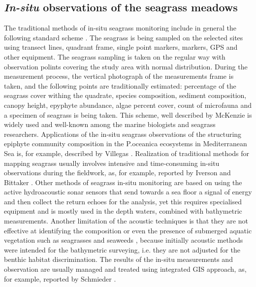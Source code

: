 \documentclass[10pt, a4paper]{article}
\begin{document}
\subsection{\textit{In-situ} observations of the seagrass meadows}
The traditional methods of in-situ seagrass monitoring include in general the following standard
scheme \cite{McKenzieetal03} \label{McKenzieetal03}. The seagrass is being sampled on the selected sites using transect lines,
quadrant frame, single point markers, markers, GPS and other equipment. The seagrass sampling is
taken on the regular way with observation polints covering the study area with normal distribution.
During the measurement process, the vertical photograph of the measurements frame is taken, and the
following points are traditionally estimated: percentage of the seagrass cover withing the quadrate,
species composition, sediment composition, canopy height, epyphyte abundance, algae percent cover,
count of microfauna and a specimen of seagrass is being taken. This scheme, well described by
McKenzie \cite{McKenzieetal03}\label{McKenzieetal03} is widely used and well-known among the marine biologists and
seagrass researchers. Applications of the in-situ seagrass observations of the structuring epiphyte
community composition in the P.oceanica ecosystems in Mediterranean Sea is, for example,
described by Villegas \cite{Villegas06}\label{Villegas06}. Realization of traditional methods for mapping seagrass usually
involves intensive and time-consuming in-situ observations during the fieldwork, as, for example,
reported by Iverson and Bittaker \cite{Iverson86}\label{Iverson86}. Other methods of seagrass in-situ monitoring are based on
using the active hydroacoustic sonar sensors that send towards a sea floor a signal of energy and then
collect the return echoes for the analysis, yet this requires specialised equipment and is mostly used in
the depth waters, combined with bathymetric measurements. Another limitation of the acoustic
techniques is that they are not effective at identifying the composition or even the presence of
submerged aquatic vegetation such as seagrasses and seaweeds \cite{Werdell03}\label{Werdell03}, because
initially acoustic methods were intended for the bathymetric surveying, i.e. they are not adjusted for
the benthic habitat discrimination. The results of the in-situ measurements and observation are usually
managed and treated using integrated GIS approach, as, for example, reported by Schmieder \cite{Schmieder97}\label{Schmieder97}.
\end{document}
